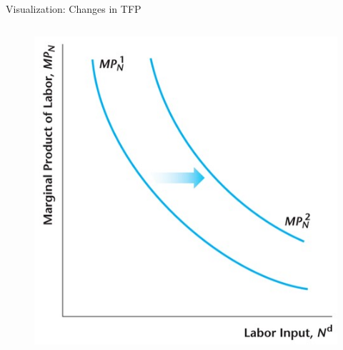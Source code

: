 \documentclass[11pt,aspectratio=43]{beamer}
\theoremstyle{definition}
\begin{document}
\begin{frame}{Visualization: Changes in TFP}
\begin{columns}
\begin{column}{0.5\textwidth}
\begin{figure}
            \includegraphics[width=\textwidth]{./figures/Figure4_17.jpg}
        \end{figure}
    \end{column}
\end{columns}

\end{frame}
\end{document}
